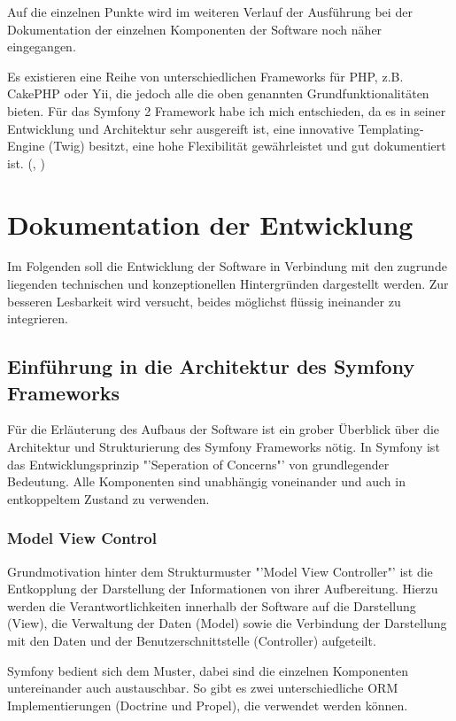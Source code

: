 \documentclass[12pt]{report}
\begin{document}
Auf die einzelnen Punkte wird im weiteren Verlauf der Ausführung bei der Dokumentation der einzelnen Komponenten der Software noch näher eingegangen.

Es existieren eine Reihe von unterschiedlichen Frameworks für PHP, z.B. CakePHP oder Yii, die jedoch alle die oben genannten Grundfunktionalitäten bieten. Für das Symfony 2 Framework habe ich mich entschieden, da es in seiner Entwicklung und Architektur sehr ausgereift ist, eine innovative Templating-Engine (Twig) besitzt, eine hohe Flexibilität gewährleistet und gut dokumentiert ist.
(\cite{PHPFrameworksComparision}, \cite{wiki:FrameworksComparision})




\chapter{Dokumentation der Entwicklung}
Im Folgenden soll die Entwicklung der Software in Verbindung mit den zugrunde liegenden technischen und konzeptionellen Hintergründen dargestellt werden. Zur besseren Lesbarkeit wird versucht, beides möglichst flüssig ineinander zu integrieren.

\section{Einführung in die Architektur des Symfony Frameworks}
Für die Erläuterung des Aufbaus der Software ist ein grober Überblick über die Architektur und Strukturierung des Symfony Frameworks nötig. In Symfony ist das Entwicklungsprinzip "'Seperation of Concerns"' von grundlegender Bedeutung. Alle Komponenten sind unabhängig voneinander und auch in entkoppeltem Zustand zu verwenden.

\subsection{Model View Control}
Grundmotivation hinter dem Strukturmuster "'Model View Controller"' ist die Entkopplung der Darstellung der Informationen von ihrer Aufbereitung. Hierzu werden die Verantwortlichkeiten innerhalb der Software auf die Darstellung (View), die Verwaltung der Daten (Model) sowie die Verbindung der Darstellung mit den Daten und der Benutzerschnittstelle (Controller) aufgeteilt.\cite{MVC}

Symfony bedient sich dem Muster, dabei sind die einzelnen Komponenten untereinander auch austauschbar. So gibt es zwei unterschiedliche ORM Implementierungen (Doctrine und Propel), die verwendet werden können.
\end{document}
